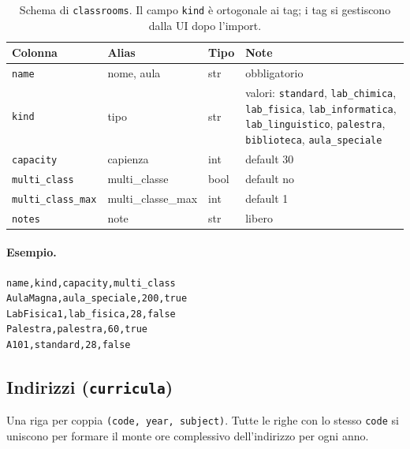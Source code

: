 \begin{table}[h]
\centering\small
\begin{tabular}{l l l p{4.6cm}}
\toprule
\textbf{Colonna} & \textbf{Alias} & \textbf{Tipo} & \textbf{Note} \\
\midrule
\texttt{name} & nome, aula & str & obbligatorio \\
\texttt{kind} & tipo & str & valori: \texttt{standard}, \texttt{lab\_chimica}, \texttt{lab\_fisica}, \texttt{lab\_informatica}, \texttt{lab\_linguistico}, \texttt{palestra}, \texttt{biblioteca}, \texttt{aula\_speciale} \\
\texttt{capacity} & capienza & int & default 30 \\
\texttt{multi\_class} & multi\_classe & bool & default no \\
\texttt{multi\_class\_max} & multi\_classe\_max & int & default 1 \\
\texttt{notes} & note & str & libero \\
\bottomrule
\end{tabular}
\caption{Schema di \texttt{classrooms}. Il campo \texttt{kind} \`e
ortogonale ai tag; i tag si gestiscono dalla UI dopo l'import.}
\label{tab:formato_classrooms}
\end{table}

\paragraph{Esempio.}
\begin{lstlisting}
name,kind,capacity,multi_class
AulaMagna,aula_speciale,200,true
LabFisica1,lab_fisica,28,false
Palestra,palestra,60,true
A101,standard,28,false
\end{lstlisting}

\subsection{Indirizzi (\texttt{curricula})}

Una riga per coppia \texttt{(code, year, subject)}. Tutte le
righe con lo stesso \texttt{code} si uniscono per formare il
monte ore complessivo dell'indirizzo per ogni anno.

